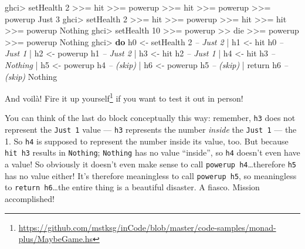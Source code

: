 \documentclass[]{article}
\newenvironment{Shaded}{}{}
\newcommand{\KeywordTok}[1]{\textcolor[rgb]{0.00,0.44,0.13}{\textbf{{#1}}}}
\newcommand{\DataTypeTok}[1]{\textcolor[rgb]{0.56,0.13,0.00}{{#1}}}
\newcommand{\DecValTok}[1]{\textcolor[rgb]{0.25,0.63,0.44}{{#1}}}
\newcommand{\CommentTok}[1]{\textcolor[rgb]{0.38,0.63,0.69}{\textit{{#1}}}}
\newcommand{\OtherTok}[1]{\textcolor[rgb]{0.00,0.44,0.13}{{#1}}}
\newcommand{\FunctionTok}[1]{\textcolor[rgb]{0.02,0.16,0.49}{{#1}}}
\newcommand{\NormalTok}[1]{{#1}}
\renewcommand{\href}[2]{#2\footnote{\url{#1}}}
\begin{document}
\begin{Shaded}
\begin{Highlighting}[]
\NormalTok{ghci}\FunctionTok{>} \NormalTok{setHealth }\DecValTok{2} \FunctionTok{>>=} \NormalTok{hit }\FunctionTok{>>=} \NormalTok{powerup }\FunctionTok{>>=} \NormalTok{hit }\FunctionTok{>>=} \NormalTok{powerup }\FunctionTok{>>=} \NormalTok{powerup}
\DataTypeTok{Just} \DecValTok{3}
\NormalTok{ghci}\FunctionTok{>} \NormalTok{setHealth }\DecValTok{2} \FunctionTok{>>=} \NormalTok{hit }\FunctionTok{>>=} \NormalTok{powerup }\FunctionTok{>>=} \NormalTok{hit }\FunctionTok{>>=} \NormalTok{hit }\FunctionTok{>>=} \NormalTok{powerup}
\DataTypeTok{Nothing}
\NormalTok{ghci}\FunctionTok{>} \NormalTok{setHealth }\DecValTok{10} \FunctionTok{>>=} \NormalTok{powerup }\FunctionTok{>>} \NormalTok{die }\FunctionTok{>>=} \NormalTok{powerup }\FunctionTok{>>=} \NormalTok{powerup}
\DataTypeTok{Nothing}
\NormalTok{ghci}\FunctionTok{>} \KeywordTok{do}  \NormalTok{h0 }\OtherTok{<-} \NormalTok{setHealth }\DecValTok{2}        \CommentTok{-- Just 2}
    \FunctionTok{|}     \NormalTok{h1 }\OtherTok{<-} \NormalTok{hit h0             }\CommentTok{-- Just 1}
    \FunctionTok{|}     \NormalTok{h2 }\OtherTok{<-} \NormalTok{powerup h1         }\CommentTok{-- Just 2}
    \FunctionTok{|}     \NormalTok{h3 }\OtherTok{<-} \NormalTok{hit h2             }\CommentTok{-- Just 1}
    \FunctionTok{|}     \NormalTok{h4 }\OtherTok{<-} \NormalTok{hit h3             }\CommentTok{-- Nothing}
    \FunctionTok{|}     \NormalTok{h5 }\OtherTok{<-} \NormalTok{powerup h4         }\CommentTok{-- (skip)}
    \FunctionTok{|}     \NormalTok{h6 }\OtherTok{<-} \NormalTok{powerup h5         }\CommentTok{-- (skip)}
    \FunctionTok{|}     \NormalTok{return h6                }\CommentTok{-- (skip)}
\DataTypeTok{Nothing}
\end{Highlighting}
\end{Shaded}

And voilà!
\href{https://github.com/mstksg/inCode/blob/master/code-samples/monad-plus/MaybeGame.hs}{Fire
it up yourself} if you want to test it out in person!

You can think of the last do block conceptually this way: remember,
\texttt{h3} does not represent the \texttt{Just\ 1} value ---
\texttt{h3} represents the number \emph{inside} the \texttt{Just\ 1} ---
the 1. So \texttt{h4} is supposed to represent the number inside its
value, too. But because \texttt{hit\ h3} results in \texttt{Nothing};
\texttt{Nothing} has no value ``inside'', so \texttt{h4} doesn't even
have a value! So obviously it doesn't even make sense to call
\texttt{powerup\ h4}\ldots{}therefore \texttt{h5} has no value either!
It's therefore meaningless to call \texttt{powerup\ h5}, so meaningless
to \texttt{return\ h6}\ldots{}the entire thing is a beautiful disaster.
A fiasco. Mission accomplished!
\end{document}
